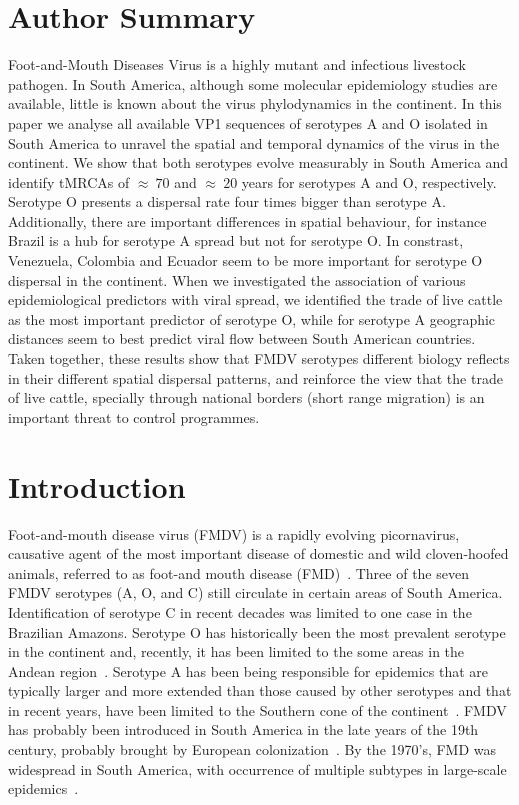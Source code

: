 \documentclass[10pt]{article}
\begin{document}
\section*{Author Summary} %
Foot-and-Mouth Diseases Virus is a highly mutant and infectious livestock pathogen.
In South America, although some molecular epidemiology studies are available, little is known about the virus phylodynamics in the continent.
In this paper we analyse all available VP1 sequences of serotypes A and O isolated in South America to unravel the spatial and temporal dynamics of the virus in the continent.
We show that both serotypes evolve measurably in South America and identify tMRCAs of $\approx~70$ and $\approx~20$ years for serotypes A and O, respectively. 
Serotype O presents a dispersal rate four times bigger than serotype A.
Additionally, there are important differences in spatial behaviour, for instance Brazil is a hub for serotype A spread but not for serotype O.
In constrast, Venezuela, Colombia and Ecuador seem to be more important for serotype O dispersal in the continent.
When we investigated the association of various epidemiological predictors with viral spread, we identified the trade of live cattle as the most important predictor of serotype O, while for serotype A geographic distances seem to best predict viral flow between South American countries.
Taken together, these results show that FMDV serotypes different biology reflects in their different spatial dispersal patterns, and reinforce the view that the trade of live cattle, specially through national borders (short range migration) is an important threat to control programmes.   
\section*{Introduction}

Foot-and-mouth disease virus (FMDV) is a rapidly evolving picornavirus, causative agent of the most important disease of domestic and wild cloven-hoofed animals, referred to as foot-and mouth disease (FMD)~\cite{review}.
Three of the seven FMDV serotypes (A, O, and C) still circulate in certain areas of South America.
Identification of serotype C in recent decades was limited to one case in the Brazilian Amazons.
Serotype O has historically been the most prevalent serotype in the continent and, recently, it has been limited to the  some areas in the Andean region~\cite{andean}.
Serotype A has been being responsible for epidemics that are typically larger and more extended than those caused by other serotypes and that in recent years, have been limited to the Southern cone of the continent~\cite{Perez2001,Malirat2012}.
FMDV has probably been introduced in South America in the late years of the 19th century, probably brought by European colonization~\cite{tully}. 
By the 1970's, FMD was widespread in South America, with occurrence of multiple subtypes in large-scale epidemics~\cite{Saraiva2003}.
\end{document}
